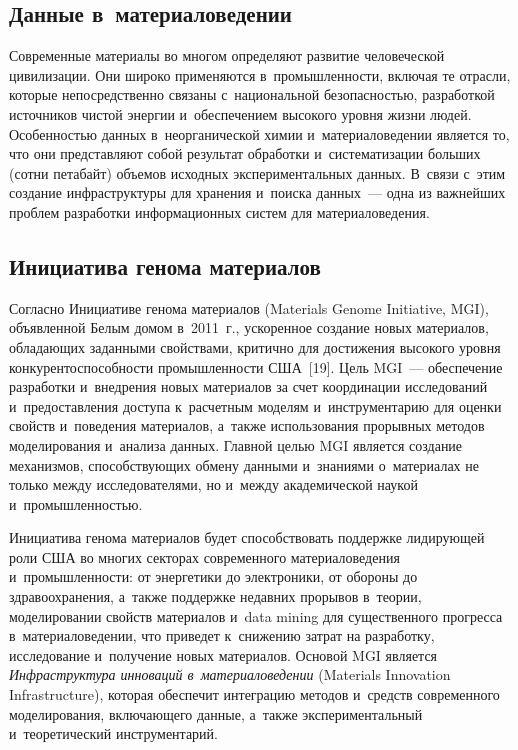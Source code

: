 \begin{multicols}{2}
\section{Данные в~материаловедении}

  Современные материалы во многом определяют развитие человеческой цивилизации. 
Они широко применяются в~промышленности, включая те отрасли, которые 
непосредственно связаны с~национальной безопасностью, разработкой источников чис\-той 
энергии и~обеспечением высокого уровня жизни людей. Особенностью данных 
в~неорганической химии и~материаловедении является то, что они представляют собой 
результат обработки и~систематизации больших (сотни петабайт) объемов исходных 
экспериментальных данных. В~связи с~этим создание инфраструктуры для хранения 
и~поиска данных~--- одна из важнейших проблем разработки информационных сис\-тем 
для материаловедения. 

\subsection{Инициатива генома материалов}

  Согласно Инициативе генома материалов 
  (Materials Genome Initiative, MGI), объявленной Белым домом в~2011~г., 
ускоренное создание новых материалов, обладающих заданными свойствами, критично 
для достижения высокого уровня конкурентоспособности промышленности США~[19]. 
Цель MGI~--- обеспечение разработки и~внедрения новых материалов за счет координации 
исследований и~предоставления доступа к~расчетным моделям и~инструментарию для 
оценки свойств и~поведения материалов, а~также использования прорывных методов 
моделирования и~анализа данных. Главной целью MGI является создание механизмов, 
способствующих обмену данными и~знаниями о~материалах не только между 
исследователями, но и~между академической наукой и~промышленностью.
  
  Инициатива генома материалов будет способствовать поддержке лидиру\-ющей роли США во многих секторах 
современного материаловедения и~промышленности: от энергетики до электроники, от 
обороны до здравоохранения, а~так\-же поддержке недавних прорывов в~тео\-рии, 
моделировании свойств материалов и~data mining для существенного прогресса 
в~материаловедении, что приведет к~снижению затрат на разработку, исследование 
и~получение новых материалов. Основой MGI является \textit{Инфраструктура инноваций 
в~материаловедении} (Materials Innovation Infrastructure), которая обеспечит интеграцию 
методов и~средств современного моделирования, включающего данные, а~так\-же 
экспериментальный и~тео\-ре\-ти\-че\-ский инструментарий. 


\end{multicols}

